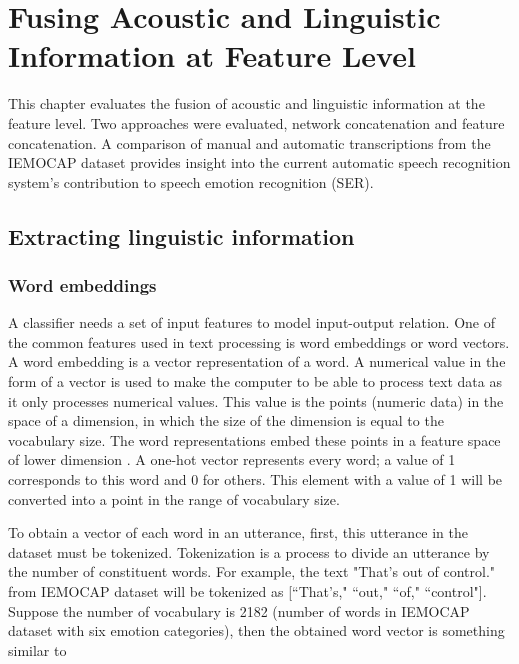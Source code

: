 \chapter{Fusing Acoustic and Linguistic Information at Feature Level}
This chapter evaluates the fusion of acoustic and linguistic information at the
feature level. Two approaches were evaluated, network concatenation and feature
concatenation. A comparison of manual and automatic transcriptions from the
IEMOCAP dataset provides insight into the current automatic speech recognition
system's contribution to speech emotion recognition (SER).

\section{Extracting linguistic information}

\subsection{Word embeddings}
A classifier needs a set of input features to model input-output relation. One
of the common features used in text processing is word embeddings or word
vectors. A word embedding is a vector representation of a word. A numerical
value in the form of a vector is used to make the computer to be able to
process text data as it only processes numerical values. This value is the
points (numeric data) in the space of a dimension, in which the size of the
dimension is equal to the vocabulary size.  The word representations embed
these points in a feature space of lower dimension
\cite{IanGoodfellowYoshuaBengio2015}. A one-hot vector represents every word; a
value of 1 corresponds to this word and 0 for others.  This element with a
value of 1 will be converted into a point in the range of vocabulary size.

To obtain a vector of each word in an utterance, first, this utterance in the
dataset must be tokenized. Tokenization is a process to divide an utterance by
the number of constituent words. For example, the text "That's out of control."
from IEMOCAP dataset will be tokenized as [``That's," ``out," ``of,"
``control"].  Suppose the number of vocabulary is 2182 (number of words in
IEMOCAP dataset with six emotion categories), then the obtained word vector is
something similar to

